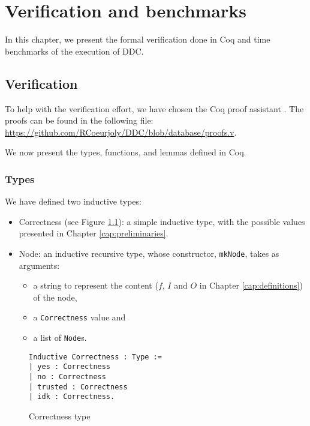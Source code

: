 \chapter{Verification and benchmarks}
\label{cap:verificationAndTesting}

In this chapter, we present the formal verification done in Coq and time benchmarks of the execution of DDC.

\section{Verification}
To help with the verification effort, we have chosen the Coq proof assistant \cite{coq}. The proofs can be found in the following file: \url{https://github.com/RCoeurjoly/DDC/blob/database/proofs.v}.

We now present the types, functions, and lemmas defined in Coq.

\subsection{Types}
We have defined two inductive types:
\begin{itemize}
    \item Correctness (see Figure \ref{fig:correctnessType}): a simple inductive type, with the possible values presented in Chapter \ref{cap:preliminaries}.
    \item Node: an inductive recursive type, whose constructor, \verb|mkNode|, takes as arguments:
    \begin{itemize}
        \item a string to represent the content (\(f\), \(I\) and \(O\) in Chapter \ref{cap:definitions}) of the node,
        \item a \verb|Correctness| value and
        \item a list of \verb|Node|s.
    \end{itemize}
     
\end{itemize}
\begin{figure}
    \centering
    \caption{Correctness type}
    \label{fig:correctnessType}
\begin{verbatim}
Inductive Correctness : Type :=
| yes : Correctness
| no : Correctness
| trusted : Correctness
| idk : Correctness.
\end{verbatim}
\end{figure}

